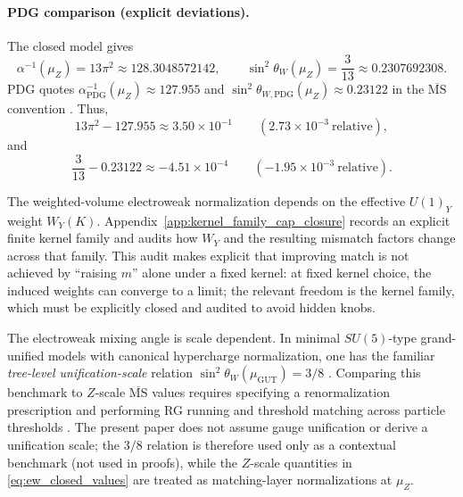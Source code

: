 \paragraph{PDG comparison (explicit deviations).}
The closed model gives
\begin{equation}\label{eq:ew_closed_values}
\alpha^{-1}(\mu_Z)=13\pi^2\approx 128.3048572142,
\qquad
\sin^2\theta_W(\mu_Z)=\frac{3}{13}\approx 0.2307692308.
\end{equation}
PDG quotes $\alpha^{-1}_{\mathrm{PDG}}(\mu_Z)\approx 127.955$ and $\sin^2\theta_{W,\mathrm{PDG}}(\mu_Z)\approx 0.23122$ in the $\overline{\mathrm{MS}}$ convention \cite{PDGRPP2024}.
Thus,
\begin{equation}\label{eq:ew_deviation_alphaZ}
13\pi^2-127.955\approx 3.50\times 10^{-1}\qquad (2.73\times 10^{-3}\ \text{relative}),
\end{equation}
and
\begin{equation}\label{eq:ew_deviation_sin2}
\frac{3}{13}-0.23122\approx -4.51\times 10^{-4}\qquad (-1.95\times 10^{-3}\ \text{relative}).
\end{equation}

\begin{remark}\label{rem:ew_kernel_family_audit}
\AuditTag The weighted-volume electroweak normalization depends on the effective $U(1)_Y$ weight $W_Y(K)$.
Appendix~\ref{app:kernel_family_cap_closure} records an explicit finite kernel family and audits how $W_Y$ and the resulting mismatch factors change across that family.
\AuditTag This audit makes explicit that improving match is not achieved by ``raising $m$'' alone under a fixed kernel: at fixed kernel choice, the induced weights can converge to a limit; the relevant freedom is the kernel family, which must be explicitly closed and audited to avoid hidden knobs.
\end{remark}

\begin{remark}\label{rem:gutsin2_benchmark}
The electroweak mixing angle is scale dependent.
\MatchTag In minimal $SU(5)$-type grand-unified models with canonical hypercharge normalization, one has the familiar \emph{tree-level unification-scale} relation $\sin^2\theta_W(\mu_{\mathrm{GUT}})=3/8$ \cite{GeorgiGlashow1974SU5,Langacker1981GUT}.
\MatchTag Comparing this benchmark to $Z$-scale $\overline{\mathrm{MS}}$ values requires specifying a renormalization prescription and performing RG running and threshold matching across particle thresholds \cite{PeskinSchroeder1995,PDGRPP2024}.
\AuditTag The present paper does not assume gauge unification or derive a unification scale; the $3/8$ relation is therefore used only as a contextual benchmark (not used in proofs), while the $Z$-scale quantities in \eqref{eq:ew_closed_values} are treated as matching-layer normalizations at $\mu_Z$.
\end{remark}

